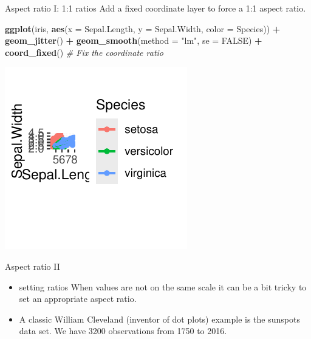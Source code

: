 \documentclass[
  ignorenonframetext,
]{beamer}
\newenvironment{Shaded}{\begin{snugshade}}{\end{snugshade}}
\newcommand{\AttributeTok}[1]{\textcolor[rgb]{0.13,0.29,0.53}{#1}}
\newcommand{\CommentTok}[1]{\textcolor[rgb]{0.56,0.35,0.01}{\textit{#1}}}
\newcommand{\ConstantTok}[1]{\textcolor[rgb]{0.56,0.35,0.01}{#1}}
\newcommand{\FunctionTok}[1]{\textcolor[rgb]{0.13,0.29,0.53}{\textbf{#1}}}
\newcommand{\NormalTok}[1]{#1}
\newcommand{\SpecialCharTok}[1]{\textcolor[rgb]{0.81,0.36,0.00}{\textbf{#1}}}
\newcommand{\StringTok}[1]{\textcolor[rgb]{0.31,0.60,0.02}{#1}}
\begin{document}
\begin{frame}[fragile]{Aspect ratio I: 1:1 ratios}
\label{aspect-ratio-i-11-ratios}
Add a fixed coordinate layer to force a 1:1 aspect ratio.


\begin{Shaded}
\begin{Highlighting}[]
\FunctionTok{ggplot}\NormalTok{(iris, }\FunctionTok{aes}\NormalTok{(}\AttributeTok{x =}\NormalTok{ Sepal.Length, }\AttributeTok{y =}\NormalTok{ Sepal.Width, }\AttributeTok{color =}\NormalTok{ Species)) }\SpecialCharTok{+}
    \FunctionTok{geom\_jitter}\NormalTok{() }\SpecialCharTok{+} \FunctionTok{geom\_smooth}\NormalTok{(}\AttributeTok{method =} \StringTok{"lm"}\NormalTok{, }\AttributeTok{se =} \ConstantTok{FALSE}\NormalTok{) }\SpecialCharTok{+}
    \FunctionTok{coord\_fixed}\NormalTok{()  }\CommentTok{\# Fix the coordinate ratio}
\end{Highlighting}
\end{Shaded}

\begin{center}\includegraphics[width=0.5\linewidth]{Figs/unnamed-chunk-41-1} \end{center}
\end{frame}

\begin{frame}{Aspect ratio II}
\label{aspect-ratio-ii}
\begin{itemize}
\item
  setting ratios When values are not on the same scale it can be a bit
  tricky to set an appropriate aspect ratio.
\item
  A classic William Cleveland (inventor of dot plots) example is the
  sunspots data set. We have 3200 observations from 1750 to 2016.
\end{itemize}
\end{frame}
\end{document}
